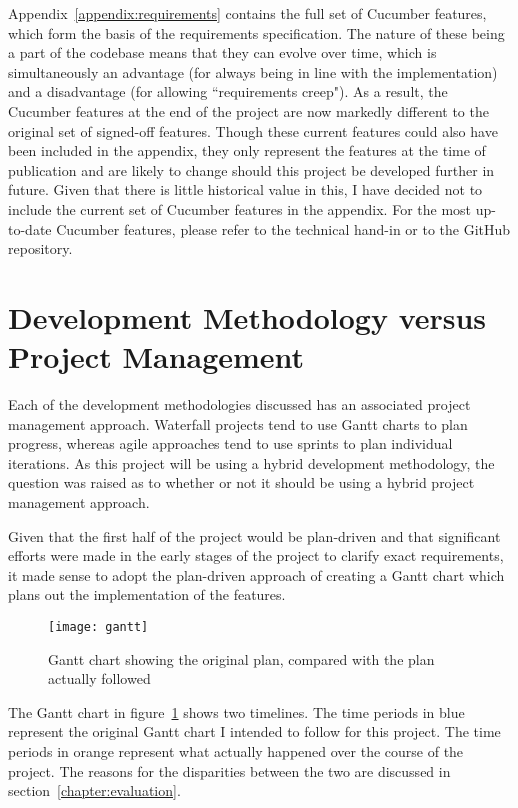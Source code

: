 Appendix~\ref{appendix:requirements} contains the full set of Cucumber features, which form the basis of the requirements specification. The nature of these being a part of the codebase means that they can evolve over time, which is simultaneously an advantage (for always being in line with the implementation) and a disadvantage (for allowing ``requirements creep"). As a result, the Cucumber features at the end of the project are now markedly different to the original set of signed-off features. Though these current features could also have been included in the appendix, they only represent the features at the time of publication and are likely to change should this project be developed further in future. Given that there is little historical value in this, I have decided not to include the current set of Cucumber features in the appendix. For the most up-to-date Cucumber features, please refer to the technical hand-in or to the GitHub repository.

\section{Development Methodology versus Project Management}

Each of the development methodologies discussed has an associated project management approach. Waterfall projects tend to use Gantt charts to plan progress, whereas agile approaches tend to use sprints to plan individual iterations. As this project will be using a hybrid development methodology, the question was raised as to whether or not it should be using a hybrid project management approach.

Given that the first half of the project would be plan-driven and that significant efforts were made in the early stages of the project to clarify exact requirements, it made sense to adopt the plan-driven approach of creating a Gantt chart which plans out the implementation of the features.

\begin{figure}[h!]
  \centering
    \ifimages
    \texttt{[image: gantt]}
    \fi
  \caption{Gantt chart showing the original plan, compared with the plan actually followed}
  \label{uml:gantt}
\end{figure}

The Gantt chart in figure~\ref{uml:gantt} shows two timelines. The time periods in blue represent the original Gantt chart I intended to follow for this project. The time periods in orange represent what actually happened over the course of the project. The reasons for the disparities between the two are discussed in section~\ref{chapter:evaluation}.

